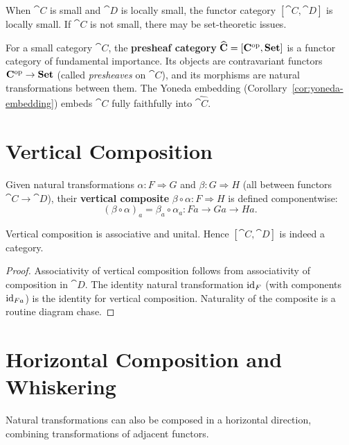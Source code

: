 \begin{remark}
When $\cat{C}$ is small and $\cat{D}$ is locally small, the functor category $[\cat{C},\cat{D}]$ is locally small. If $\cat{C}$ is not small, there may be set-theoretic issues.
\end{remark}

\begin{example}
For a small category $\cat{C}$, the \textbf{presheaf category} $\widehat{\mathbf{C}} = [\mathbf{C}^{\mathrm{op}}, \mathbf{Set}]$ is a functor category of fundamental importance. Its objects are contravariant functors $\mathbf{C}^{\mathrm{op}} \to \mathbf{Set}$ (called \emph{presheaves} on $\cat{C}$), and its morphisms are natural transformations between them. The Yoneda embedding (Corollary~\ref{cor:yoneda-embedding}) embeds $\cat{C}$ fully faithfully into $\widehat{\cat{C}}$.
\end{example}

\section{Vertical Composition}

\begin{definition}
Given natural transformations $\alpha: F \Rightarrow G$ and $\beta: G \Rightarrow H$ (all between functors $\cat{C} \to \cat{D}$), their \textbf{vertical composite} $\beta \circ \alpha: F \Rightarrow H$ is defined componentwise:
\[
  (\beta \circ \alpha)_a = \beta_a \circ \alpha_a: Fa \to Ga \to Ha.
\]
\end{definition}

\begin{proposition}
Vertical composition is associative and unital. Hence $[\cat{C},\cat{D}]$ is indeed a category.
\end{proposition}

\begin{proof}
Associativity of vertical composition follows from associativity of composition in $\cat{D}$. The identity natural transformation $\mathrm{id}_F$ (with components $\mathrm{id}_{Fa}$) is the identity for vertical composition. Naturality of the composite is a routine diagram chase.
\end{proof}

\section{Horizontal Composition and Whiskering}

Natural transformations can also be composed in a horizontal direction, combining transformations of adjacent functors.

